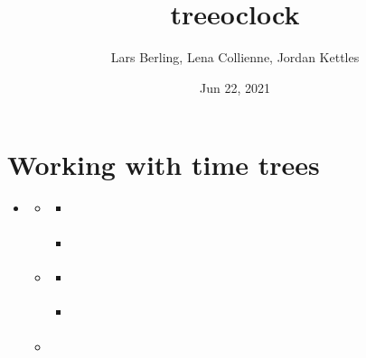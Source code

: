 \documentclass[letterpaper,10pt,english]{sphinxmanual}
\title{treeoclock}
\date{Jun 22, 2021}
\author{Lars Berling, Lena Collienne, Jordan Kettles}
\begin{document}
\pagestyle{empty}
\sphinxmaketitle
\pagestyle{plain}
\sphinxtableofcontents
\pagestyle{normal}
\label{\detokenize{index::doc}}



\chapter{Working with time trees}
\label{\detokenize{trees:working-with-time-trees}}\label{\detokenize{trees::doc}}
\begin{sphinxShadowBox}
\begin{itemize}
\item {} 
\sphinxAtStartPar
{}\label{\detokenize{trees:id1}}{\hyperref[\detokenize{trees:working-with-time-trees}]{}}
\begin{itemize}
\item {} 
\sphinxAtStartPar
{}\label{\detokenize{trees:id2}}{\hyperref[\detokenize{trees:the-timetree-class}]{}}
\begin{itemize}
\item {} 
\sphinxAtStartPar
{}\label{\detokenize{trees:id3}}{\hyperref[\detokenize{trees:timetree-attributes}]{}}

\item {} 
\sphinxAtStartPar
{}\label{\detokenize{trees:id4}}{\hyperref[\detokenize{trees:ete3-functionalities}]{}}

\end{itemize}

\item {} 
\sphinxAtStartPar
{}\label{\detokenize{trees:id5}}{\hyperref[\detokenize{trees:the-timetreeset-class}]{}}
\begin{itemize}
\item {} 
\sphinxAtStartPar
{}\label{\detokenize{trees:id6}}{\hyperref[\detokenize{trees:reading-trees}]{}}

\item {} 
\sphinxAtStartPar
{}\label{\detokenize{trees:id7}}{\hyperref[\detokenize{trees:writing-trees}]{}}

\end{itemize}

\item {} 
\sphinxAtStartPar
{}\label{\detokenize{trees:id8}}{\hyperref[\detokenize{trees:random-trees}]{}}


\end{itemize}
\end{itemize}
\end{sphinxShadowBox}
\end{document}
